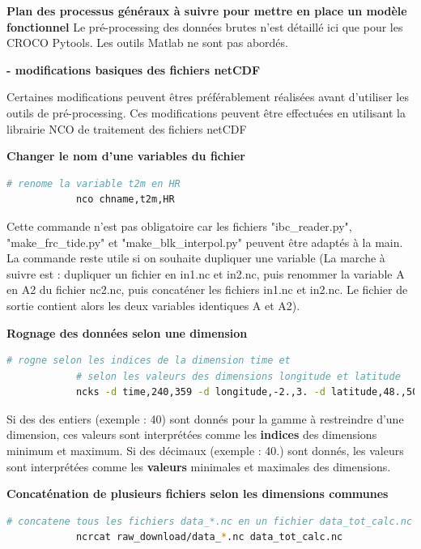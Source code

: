 \documentclass[10pt,a4paper,titlepage]{article}
\begin{document}
\begin{processEnv}{\textbf{Plan des processus généraux à suivre pour mettre en place un modèle fonctionnel}}
    Le pré-processing des données brutes n'est détaillé ici que pour les CROCO Pytools. Les outils Matlab ne sont pas abordés.

    \textbf{- modifications basiques des fichiers netCDF}

    Certaines modifications peuvent êtres préférablement réalisées avant d'utiliser les outils de pré-processing. Ces modifications peuvent être effectuées en utilisant la librairie NCO de traitement des fichiers netCDF

    \begin{codeEnv}{\textbf{Changer le nom d'une variables du fichier}}
        \begin{lstlisting}[language=bash]
            # renome la variable t2m en HR
            nco chname,t2m,HR
        \end{lstlisting}
    \end{codeEnv}

    Cette commande n'est pas obligatoire car les fichiers "ibc\_reader.py", "make\_frc\_tide.py" et "make\_blk\_interpol.py" peuvent être adaptés à la main.
    La commande reste utile si on souhaite dupliquer une variable (La marche à suivre est : dupliquer un fichier en in1.nc et in2.nc, puis renommer la variable A en A2 du fichier nc2.nc, puis concaténer les fichiers in1.nc et in2.nc. Le fichier de sortie contient alors les deux variables identiques A et A2).

    \begin{codeEnv}{\textbf{Rognage des données selon une dimension}}
        \begin{lstlisting}[language=bash]
            # rogne selon les indices de la dimension time et
            # selon les valeurs des dimensions longitude et latitude
            ncks -d time,240,359 -d longitude,-2.,3. -d latitude,48.,50. in.nc out.nc
        \end{lstlisting}
    \end{codeEnv}

    Si des des entiers (exemple : 40) sont donnés pour la gamme à restreindre d'une dimension, ces valeurs sont interprétées comme les \textbf{indices} des dimensions minimum et maximum. Si des décimaux (exemple : 40.) sont donnés, les valeurs sont interprétées comme les \textbf{valeurs }minimales et maximales des dimensions.

    \begin{codeEnv}{\textbf{Concaténation de plusieurs fichiers selon les dimensions communes}}
        \begin{lstlisting}[language=bash]
            # concatene tous les fichiers data_*.nc en un fichier data_tot_calc.nc
            ncrcat raw_download/data_*.nc data_tot_calc.nc
        \end{lstlisting}
    \end{codeEnv}


\end{processEnv}
\end{document}

